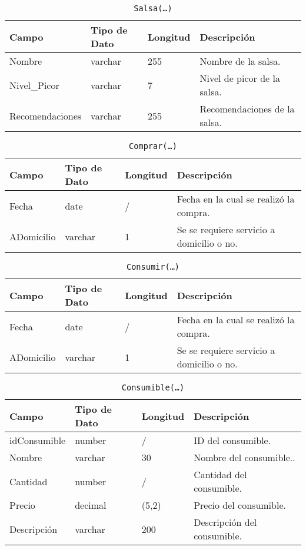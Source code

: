 \documentclass{article}
\begin{document}
\begin{table}[h]
	\centering
	\caption{\texttt{Salsa(\ldots)}}
	\begin{tabular}{|l|l|l|l|}
		\hline
		Campo           & Tipo de Dato & Longitud & Descripción                  \\ \hline
		Nombre          & varchar      & 255      & Nombre de la salsa.          \\ \hline
		Nivel\_Picor    & varchar      & 7        & Nivel de picor de la salsa.  \\ \hline
		Recomendaciones & varchar      & 255      & Recomendaciones de la salsa. \\ \hline
	\end{tabular}
\end{table}

\begin{table}[h]
	\centering
	\caption{\texttt{Comprar(\ldots)}}
	\begin{tabular}{|l|l|l|l|}
		\hline
		Campo      & Tipo de Dato & Longitud & Descripción                             	\\ \hline
		Fecha      & date         & /        & Fecha en la cual se realizó la compra.	\\ \hline
		ADomicilio & varchar      & 1        & Se se requiere servicio a domicilio o no. \\ \hline
	\end{tabular}
\end{table}

\begin{table}[h]
	\centering
	\caption{\texttt{Consumir(\ldots)}}
	\begin{tabular}{|l|l|l|l|}
		\hline
		Campo      & Tipo de Dato & Longitud & Descripción                             	\\ \hline
		Fecha      & date         & /        & Fecha en la cual se realizó la compra.	\\ \hline
		ADomicilio & varchar      & 1        & Se se requiere servicio a domicilio o no. \\ \hline
	\end{tabular}
\end{table}

\begin{table}[h]
	\centering
	\caption{\texttt{Consumible(\ldots)}}
	\begin{tabular}{|l|l|l|l|}
		\hline
		Campo        & Tipo de Dato & Longitud & Descripción               \\ \hline
		idConsumible & number       & /        & ID del consumible.         \\ \hline
		Nombre       & varchar      & 30       & Nombre del consumible..    \\ \hline
		Cantidad     & number       & /        & Cantidad del consumible.   \\ \hline
	 	Precio       & decimal      & (5,2)    & Precio del consumible.     \\ \hline
		Descripción  & varchar      & 200      & Descripción del consumible. \\ \hline
	\end{tabular}
\end{table}
\end{document}
